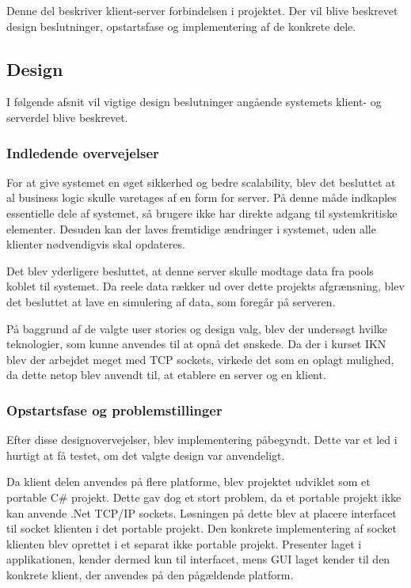 Denne del beskriver klient-server forbindelsen i projektet. Der vil blive beskrevet design beslutninger, opstartsfase og implementering af de konkrete dele.

\subsection{Design}
I følgende afsnit vil vigtige design beslutninger angående systemets klient- og serverdel blive beskrevet. 

\subsubsection{Indledende overvejelser}
For at give systemet en øget sikkerhed og bedre scalability, blev det besluttet at al business logic skulle varetages af en form for server. På denne måde indkaples essentielle dele af systemet, så brugere ikke har direkte adgang til systemkritiske elementer. Desuden kan der laves fremtidige ændringer i systemet, uden alle klienter nødvendigvis skal opdateres.

Det blev yderligere besluttet, at denne server skulle modtage data fra pools koblet til systemet. Da reele data rækker ud over dette projekts afgrænsning, blev det besluttet at lave en simulering af data, som foregår på serveren.

På baggrund af de valgte user stories og design valg, blev der undersøgt hvilke teknologier, som kunne anvendes til at opnå det ønskede. Da der i kurset IKN blev der arbejdet meget med TCP sockets, virkede det som en oplagt mulighed, da dette netop blev anvendt til, at etablere en server og en klient.

\subsubsection{Opstartsfase og problemstillinger}
Efter disse designovervejelser, blev implementering påbegyndt. Dette var et led i hurtigt at få testet, om det valgte design var anvendeligt. 

Da klient delen anvendes på flere platforme, blev projektet udviklet som et portable C\# projekt. Dette gav dog et stort problem, da et portable projekt ikke kan anvende .Net TCP/IP sockets. Løsningen på dette blev at placere interfacet til socket klienten i det portable projekt. Den konkrete implementering af socket klienten blev oprettet i et separat ikke portable projekt. Presenter laget i applikationen, kender dermed kun til interfacet, mens GUI laget kender til den konkrete klient, der anvendes på den pågældende platform.

